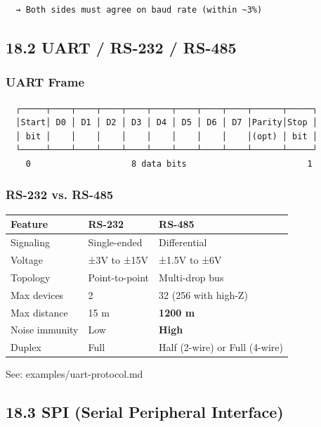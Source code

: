 \documentclass[11pt,a4paper]{book}
\begin{document}
\begin{itemize}
\begin{lstlisting}
  → Both sides must agree on baud rate (within ~3%)
\end{lstlisting}

\medskip\noindent\hrulefill\medskip

\subsection{18.2 UART / RS-232 / RS-485}

\subsubsection{UART Frame}

\begin{lstlisting}
  ┌─────┬────┬────┬────┬────┬────┬────┬────┬────┬──────┬─────┐
  │Start│ D0 │ D1 │ D2 │ D3 │ D4 │ D5 │ D6 │ D7 │Parity│Stop │
  │ bit │    │    │    │    │    │    │    │    │(opt) │ bit │
  └─────┴────┴────┴────┴────┴────┴────┴────┴────┴──────┴─────┘
    0                    8 data bits                        1
\end{lstlisting}

\subsubsection{RS-232 vs. RS-485}

\begin{center}
\begin{tabular}{|l|l|l|}
\hline
Feature & RS-232 & RS-485 \\
\hline
Signaling & Single-ended & Differential \\
Voltage & ±3V to ±15V & ±1.5V to ±6V \\
Topology & Point-to-point & Multi-drop bus \\
Max devices & 2 & 32 (256 with high-Z) \\
Max distance & 15 m & \textbf{1200 m} \\
Noise immunity & Low & \textbf{High} \\
Duplex & Full & Half (2-wire) or Full (4-wire) \\
\hline
\end{tabular}
\end{center}

See: examples/uart-protocol.md

\medskip\noindent\hrulefill\medskip

\subsection{18.3 SPI (Serial Peripheral Interface)}


\end{itemize}
\end{document}
